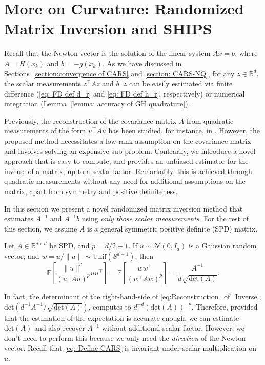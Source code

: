 \section{More on Curvature: Randomized Matrix Inversion and SHIPS}\label{section:SHIPS}
Recall that the Newton vector is the solution of the linear system $Ax=b$, where $A = H(x_k)$ and $b = - g(x_k)$.
As we have discussed in Sections~\ref{section:convergence of CARS} and \ref{section: CARS-NQ},
for any $z \in \mathbb{R}^d$, the scalar measurements $z^{\top}A z$ and $b^{\top}z$ can be easily estimated via finite difference (\eqref{eq: FD def d_r} and \eqref{eq: FD def h_r}, respectively) or numerical integration (Lemma~\ref{lemma: accuracy of GH quadrature}).

Previously, the reconstruction of the covariance matrix $A$ from quadratic measurements of the form $u^{\top} A u$ has been studied, for instance, in \cite{chen2015exact}. However, the proposed method necessitates a low-rank assumption on the covariance matrix and involves solving an expensive sub-problem.
Contrarily, we introduce a novel approach that is easy to compute, and provides an unbiased estimator for the inverse of a matrix, up to a scalar factor.
Remarkably, this is achieved through quadratic measurements without any need for additional assumptions on the matrix, apart from symmetry and positive definiteness.

In this section we present a novel randomized matrix inversion method that estimates $A^{-1}$ and $A^{-1}b$ using \emph{only those scalar measurements}.
For the rest of this section, we assume $A$ is a general symmetric positive definite (SPD) matrix.

\begin{theorem}
    \label{thm:Reconstruction_of_Inverse_using_scalar_measurements}
    Let $A \in \mathbb{R}^{d\times d}$ be SPD, and $p = d/2 + 1$.
    If $u \sim \mathcal{N}(0,I_d)$ is a Gaussian random vector, and $w = u/\|u\| \sim \mathrm{Unif}(S^{d-1})$, then
    \begin{equation} \label{eq:Reconstruction_of_Inverse}
        \mathbb{E}\left[ \frac{\|u\|^{d}}{(u^{\top}Au)^p}uu^{\top} \right]
        = \mathbb{E}\left[\frac{ww^{\top}}{(w^{\top}Aw)^p}\right]
        = \frac{A^{-1}}{d \sqrt{\mathrm{det}(A)}} .
    \end{equation}
\end{theorem}

In fact, the determinant of the right-hand-side of \eqref{eq:Reconstruction_of_Inverse}, $\mathrm{det}(d^{-1}A^{-1}/\sqrt{\mathrm{det}(A)})$, computes to $d^{-d}(\mathrm{det}(A))^{-p}$. Therefore, provided that the estimation of the expectation is accurate enough, we can estimate $\mathrm{det}(A)$ and also recover $A^{-1}$ without additional scalar factor.
However, we don't need to perform this because we only need the \emph{direction} of the Newton vector. Recall that \eqref{eq: Define CARS} is invariant under scalar multiplication on $u$.

